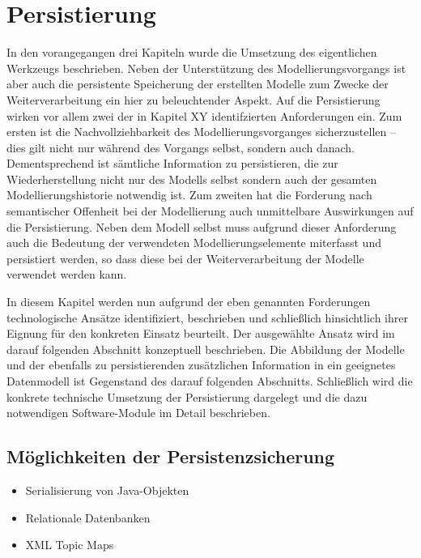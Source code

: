 \chapter{Persistierung} %
\label{cha:persistierung}

In den vorangegangen drei Kapiteln wurde die Umsetzung des eigentlichen Werkzeugs beschrieben. Neben der Unterstützung des Modellierungsvorgangs ist aber auch die persistente Speicherung der erstellten Modelle zum Zwecke der Weiterverarbeitung ein hier zu beleuchtender Aspekt. Auf die Persistierung wirken vor allem zwei der in Kapitel XY identifzierten Anforderungen ein. Zum ersten ist die Nachvollziehbarkeit des Modellierungsvorganges sicherzustellen -- dies gilt nicht nur während des Vorgangs selbst, sondern auch danach. Dementsprechend ist sämtliche Information zu persistieren, die zur Wiederherstellung nicht nur des Modells selbst sondern auch der gesamten Modellierungshistorie notwendig ist. Zum zweiten hat die Forderung nach semantischer Offenheit bei der Modellierung auch unmittelbare Auswirkungen auf die Persistierung. Neben dem Modell selbst muss aufgrund dieser Anforderung auch die Bedeutung der verwendeten Modellierungselemente miterfasst und persistiert werden, so dass diese bei der Weiterverarbeitung der Modelle verwendet werden kann.

In diesem Kapitel werden nun aufgrund der eben genannten Forderungen technologische Ansätze identifiziert, beschrieben und schließlich hinsichtlich ihrer Eignung für den konkreten Einsatz beurteilt. Der ausgewählte Ansatz wird im darauf folgenden Abschnitt konzeptuell beschrieben. Die Abbildung der Modelle und der ebenfalls zu persistierenden zusätzlichen Information in ein geeignetes Datenmodell ist Gegenstand des darauf folgenden Abschnitts. Schließlich wird die konkrete technische Umsetzung der Persistierung dargelegt und die dazu notwendigen Software-Module im Detail beschrieben.
 
\section{Möglichkeiten der Persistenzsicherung} %
\label{sec:möglichkeiten_der_persistenzsicherung}

\begin{itemize}
	\item Serialisierung von Java-Objekten
	\item Relationale Datenbanken
	\item XML Topic Maps
\end{itemize}

